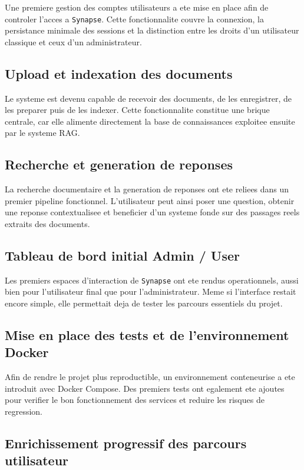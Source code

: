 Une premiere gestion des comptes utilisateurs a ete mise en place afin de controler l'acces a \texttt{Synapse}. Cette fonctionnalite couvre la connexion, la persistance minimale des sessions et la distinction entre les droits d'un utilisateur classique et ceux d'un administrateur.

\subsection{Upload et indexation des documents}

Le systeme est devenu capable de recevoir des documents, de les enregistrer, de les preparer puis de les indexer. Cette fonctionnalite constitue une brique centrale, car elle alimente directement la base de connaissances exploitee ensuite par le systeme RAG.

\subsection{Recherche et generation de reponses}

La recherche documentaire et la generation de reponses ont ete reliees dans un premier pipeline fonctionnel. L'utilisateur peut ainsi poser une question, obtenir une reponse contextualisee et beneficier d'un systeme fonde sur des passages reels extraits des documents.

\subsection{Tableau de bord initial Admin / User}

Les premiers espaces d'interaction de \texttt{Synapse} ont ete rendus operationnels, aussi bien pour l'utilisateur final que pour l'administrateur. Meme si l'interface restait encore simple, elle permettait deja de tester les parcours essentiels du projet.

\subsection{Mise en place des tests et de l'environnement Docker}

Afin de rendre le projet plus reproductible, un environnement conteneurise a ete introduit avec Docker Compose. Des premiers tests ont egalement ete ajoutes pour verifier le bon fonctionnement des services et reduire les risques de regression.

\subsection{Enrichissement progressif des parcours utilisateur}

